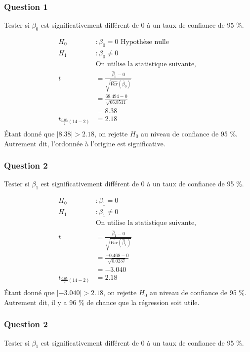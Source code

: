 \documentclass[11pt,french]{report}
\begin{document}
\subsubsection*{Question 1}
Tester si $\beta_0$ est significativement différent de 0 à un taux de confiance de 95 \%.

\begin{align*}
H_0 &: \beta_0 = 0 \text{ Hypothèse nulle} \\
H_1 &: \beta_0 \neq 0 \\
&\text{On utilise la statistique suivante, } \\
t &= \frac{\hat{\beta}_0 - 0 }{\sqrt{\widehat{Var}(\hat{\beta}_0)}} \\
&= \frac{68.494 - 0}{\sqrt{66.8511}}\\
&= 8.38\\
t_{\frac{0.05}{2}(14-2)} &= 2.18 \\
\end{align*}
Étant donné que $|8.38| > 2.18$, on rejette $H_0$ au niveau de confiance de 95 \%. Autrement dit, l'ordonnée à l'origine est significative.

\subsubsection*{Question 2}
Tester si $\beta_1$ est significativement différent de 0 à un taux de confiance de 95 \%.

\begin{align*}
H_0 &: \beta_1 = 0\\
H_1 &: \beta_1 \neq 0 \\
&\text{On utilise la statistique suivante, } \\
t &= \frac{\hat{\beta}_1 - 0 }{\sqrt{\widehat{Var}(\hat{\beta}_1)}} \\
&= \frac{-0.468 - 0}{\sqrt{0.0237}}\\
&= -3.040\\
t_{\frac{0.05}{2}(14-2)} &= 2.18\\
\end{align*}
Étant donné que $|-3.040| > 2.18$, on rejette $H_0$ au niveau de confiance de 95 \%. Autrement dit, il y a 96 \% de chance que la régression soit utile.

\subsubsection*{Question 2}
Tester si $\beta_1$ est significativement différent de 0 à un taux de confiance de 95 \%.
\end{document}
